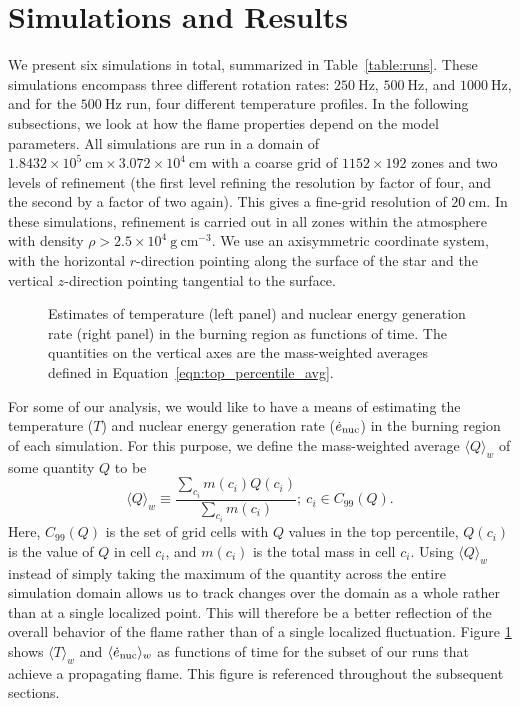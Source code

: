 \documentclass[preprint,times,tighten]{aastex63}
\newcommand{\enucdot}{\dot{e}_{\rm nuc}}
\newcommand{\repavg}[1]{\langle #1 \rangle_w}
\newcommand{\gcc}{\mathrm{g~cm^{-3} }}
\begin{document}
\section{Simulations and Results}\label{Sec:results}


We present six simulations in total, summarized in
Table~\ref{table:runs}.  These simulations encompass three different
rotation rates: $250~\mathrm{Hz}$, $500~\mathrm{Hz}$, and $1000~\mathrm{Hz}$, 
and for the $500~\mathrm{Hz}$ run, four
different temperature profiles.  In the following subsections, we look
at how the flame properties depend on the model parameters.  All
simulations are run in a domain of $1.8432\times 10^5~\mathrm{cm} \times
3.072\times 10^4~\mathrm{cm}$ with a coarse grid of $1152 \times 192$
zones and two levels of refinement (the first level refining the resolution 
by factor of four, and the second by a factor of two again).  This gives a
fine-grid resolution of $20~\mathrm{cm}$.  In these simulations, refinement 
is carried out in all zones within the atmosphere
with density $\rho > 2.5\times 10^4~\gcc$. We use an axisymmetric coordinate system, 
with the horizontal $r$-direction pointing along the surface of the star and the 
vertical $z$-direction pointing tangential to the surface.

\begin{figure}
	\caption{\label{fig:maxima}Estimates of temperature (left panel) and nuclear energy generation 
	rate (right panel) in the burning region as functions of time. The quantities on the vertical 
	axes are the mass-weighted averages defined in Equation~\ref{eqn:top_percentile_avg}.}
\end{figure}

For some of our analysis, we would like to have a means of estimating the temperature ($T$) and 
nuclear energy generation rate ($\enucdot$) in the burning region of each simulation. For this 
purpose, we define the mass-weighted average $\repavg{Q}$ of some quantity $Q$ to be
\begin{equation}
	\label{eqn:top_percentile_avg}
	\repavg{Q} \equiv \frac{\sum_{c_i} m(c_i) Q(c_i)}{\sum_{c_i} m(c_i)}; ~c_i \in C_{99}(Q).
\end{equation}
\noindent Here, $C_{99}(Q)$ is the set of grid cells with $Q$ values in the top percentile, 
$Q(c_i)$ is the value of $Q$ in cell $c_i$, and $m(c_i)$ is the total mass in cell $c_i$. 
Using $\repavg{Q}$ instead of simply taking the maximum of the quantity across the entire 
simulation domain allows us to track changes over the domain as a whole rather than at a single 
localized point. This will therefore be a better reflection of the overall behavior of the flame 
rather than of a single localized fluctuation. Figure \ref{fig:maxima} shows $\repavg{T}$ and 
$\repavg{\enucdot}$ as functions of time for the subset of our runs that achieve a propagating 
flame. This figure is referenced throughout the subsequent sections.
\end{document}
